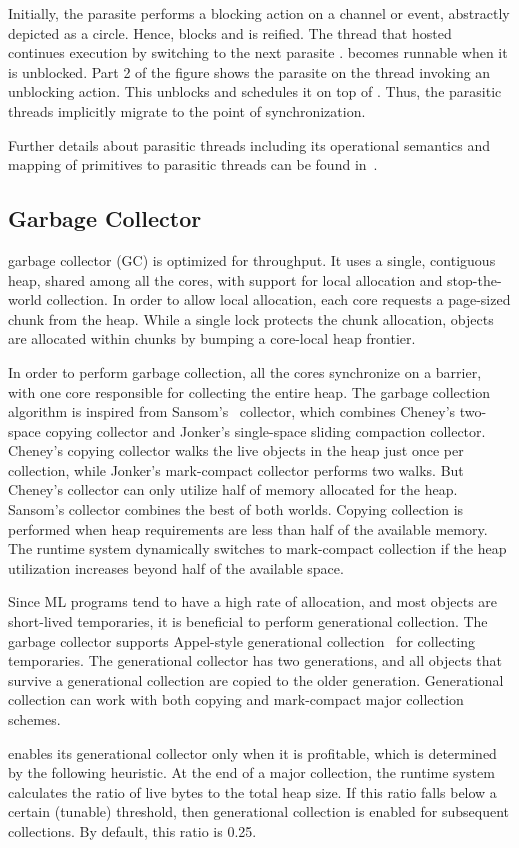 Initially, the parasite  performs a blocking action on a channel or
event, abstractly depicted as a circle. Hence,  blocks and is
reified. The thread  that hosted  continues execution by
switching to the next parasite .  becomes runnable when it
is unblocked. Part 2 of the figure shows the parasite  on the thread
 invoking an unblocking action. This unblocks  and
schedules it on top of . Thus, the parasitic threads implicitly
migrate to the point of synchronization.

Further details about parasitic threads including its operational semantics and
mapping of \acml primitives to parasitic threads can be found in~\cite{JFP14}.

\subsection{Garbage Collector}
\label{sec:gc}

\MM garbage collector (GC) is optimized for throughput. It uses a single,
contiguous heap, shared among all the cores, with support for local allocation
and stop-the-world collection. In order to allow local allocation, each core
requests a page-sized chunk from the heap. While a single lock protects the
chunk allocation, objects are allocated within chunks by bumping a core-local
heap frontier.

In order to perform garbage collection, all the cores synchronize on a barrier,
with one core responsible for collecting the entire heap. The garbage
collection algorithm is inspired from Sansom's~\cite{Sansom91} collector, which
combines Cheney's two-space copying collector and Jonker's single-space sliding
compaction collector. Cheney's copying collector walks the live objects in the
heap just once per collection, while Jonker's mark-compact collector performs
two walks. But Cheney's collector can only utilize half of memory allocated for
the heap. Sansom's collector combines the best of both worlds. Copying
collection is performed when heap requirements are less than half of the
available memory. The runtime system dynamically switches to mark-compact
collection if the heap utilization increases beyond half of the available
space.

Since ML programs tend to have a high rate of allocation, and most objects are
short-lived temporaries, it is beneficial to perform generational collection.
The garbage collector supports Appel-style generational
collection~\cite{Appel89} for collecting temporaries. The generational
collector has two generations, and all objects that survive a generational
collection are copied to the older generation. Generational collection can work
with both copying and mark-compact major collection schemes.

\MM enables its generational collector only when it is profitable, which is
determined by the following heuristic. At the end of a major collection, the
runtime system calculates the ratio of live bytes to the total heap size. If
this ratio falls below a certain (tunable) threshold, then generational
collection is enabled for subsequent collections. By default, this ratio is
0.25.
